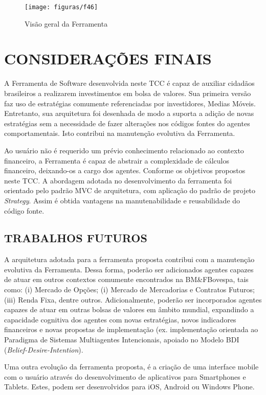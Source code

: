\begin{figure}[h]
\centering
\label{f46}
\texttt{[image: figuras/f46]}
\caption{Visão geral da Ferramenta}
\end{figure}


\newpage
\chapter{CONSIDERAÇÕES FINAIS}

A Ferramenta de Software desenvolvida neste TCC é capaz de auxiliar cidadãos brasileiros a realizarem investimentos em bolsa de valores. Sua primeira versão faz uso de estratégias comumente referenciadas por investidores, Medias Móveis.  Entretanto, sua arquitetura foi desenhada de modo a suporta a adição de novas estratégias sem a necessidade de fazer alterações nos códigos fontes do agentes comportamentais. Isto contribui na manutenção evolutiva da Ferramenta.

Ao usuário não é requerido um prévio conhecimento relacionado ao contexto financeiro, a Ferramenta é capaz de abstrair a complexidade de cálculos financeiro, deixando-os a cargo dos agentes. Conforme os objetivos propostos neste TCC. A abordagem adotada no desenvolvimento da ferramenta foi orientado pelo padrão MVC de arquitetura, com aplicação do padrão de projeto \textit{Strategy}. Assim é obtida vantagens na manutenabilidade e reusabilidade do código fonte.


\section{TRABALHOS FUTUROS}

A arquitetura adotada para a ferramenta proposta contribui com a manutenção evolutiva da Ferramenta. Dessa forma, poderão ser adicionados agentes capazes de atuar em outros contextos comumente encontrados na BM\&FBovespa, tais como: (i) Mercado de Opções; (i) Mercado de Mercadorias e Contratos Futuros; (iii) Renda Fixa, dentre outros. Adicionalmente, poderão ser incorporados agentes capazes de atuar em outras bolsas de valores em âmbito mundial, expandindo a capacidade cognitiva dos agentes com novas estratégias, novos indicadores financeiros e novas propostas de implementação (ex. implementação orientada ao Paradigma de Sistemas Multiagentes Intencionais, apoiado no Modelo BDI (\textit{Belief-Desire-Intention}).

Uma outra evolução da ferramenta proposta, é a criação de uma interface mobile com o usuário através do desenvolvimento de aplicativos para Smartphones e Tablets. Estes, podem ser desenvolvidos para iOS, Android ou Windows Phone. 



